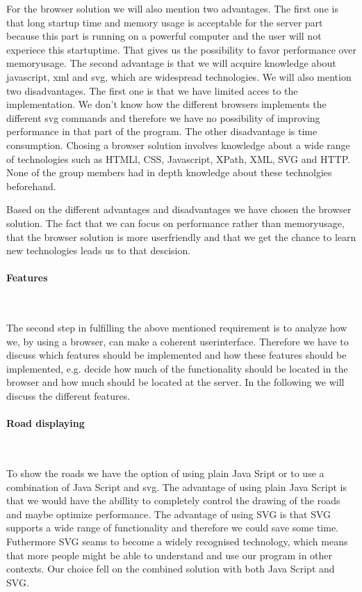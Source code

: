\documentclass[a4paper,10pt,titlepage]{article}
\begin{document}
For the browser solution we will also mention two advantages. The first one is that long startup time and memory usage is acceptable for the server part because this part is running on a powerful computer and the user will not experiece this startuptime. That gives us the possibility to favor performance over memoryusage. The second advantage is that we will acquire knowledge about javascript, xml and svg, which are widespread technologies. We will also mention two disadvantages. The first one is that we have limited acces to the implementation. We don't know how the different browsers implements the different svg commands and therefore we have no possibility of improving performance in that part of the program. The other disadvantage is time consumption. Chosing a browser solution involves knowledge about a wide range of technologies such as HTMLl, CSS, Javascript, XPath, XML, SVG and HTTP. None of the group members had in depth knowledge about these technolgies beforehand.    

Based on the different advantages and disadvantages we have chosen the browser solution. The fact that we can focus on performance rather than memoryusage, that the browser solution is more userfriendly and that we get the chance to learn new technologies leads us to that descision.

\paragraph{Features}\mbox{}\

The second step in fulfilling the above mentioned requirement is to analyze how we, by using a browser, can make a coherent userinterface. Therefore we have to discuss which features should be implemented and how these features should be implemented, e.g. decide how much of the functionality should be located in the browser and how much should be located at the server. In the following we will discuss the different features.

\paragraph{Road displaying}\mbox{}\

To show the roads we have the option of using plain Java Sript or to use a combination of Java Script and svg. The advantage of using plain Java Script is that we would have the abillity to completely control the drawing of the roads and maybe optimize performance. The advantage of using SVG is that SVG supports a wide range of functionality and therefore we could save some time. Futhermore SVG seams to become a widely recognised technology, which means that more people might be able to understand and use our program in other contexts. Our choice fell on the combined solution with both Java Script and SVG. 
 
\end{document}
